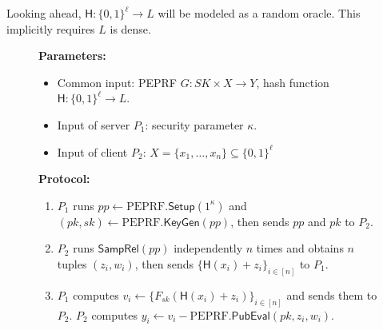 \documentclass[a4paper,10pt]{article}
\begin{document}
\begin{remark}
Looking ahead, $\mathsf{H}: \{0,1\}^\ell \rightarrow L$ will be modeled as a random oracle. 
This implicitly requires $L$ is dense. 
\end{remark}

\begin{figure}[!hbtp]
\begin{framed}
\begin{minipage}[center]{\textwidth}
\begin{trivlist}
\item \textbf{Parameters:} 
\begin{itemize}
    \item Common input: PEPRF $G: SK \times X \rightarrow Y$, hash function $\mathsf{H}: \{0,1\}^\ell \rightarrow L$. 

    \item Input of server $P_1$: security parameter $\kappa$.

    \item Input of client $P_2$: $X = \{x_1, \dots, x_n\} \subseteq \{0,1\}^\ell$ 
\end{itemize}

\item \textbf{Protocol:}

\begin{enumerate}
\item $P_1$ runs $pp \leftarrow \text{PEPRF}.\mathsf{Setup}(1^\kappa)$ 
    and $(pk, sk) \leftarrow \text{PEPRF}.\mathsf{KeyGen}(pp)$, 
    then sends $pp$ and $pk$ to $P_2$. 

\item $P_2$ runs $\mathsf{SampRel}(pp)$ independently $n$ times and obtains $n$ tuples $(z_i, w_i)$, 
    then sends $\{\mathsf{H}(x_i)+z_i\}_{i \in [n]}$ to $P_1$. 

\item $P_1$ computes $v_i \leftarrow \{F_{sk}(\mathsf{H}(x_i)+z_i)\}_{i \in [n]}$ and sends them to $P_2$. 
    $P_2$ computes $y_i \leftarrow v_i - \text{PEPRF}.\mathsf{PubEval}(pk, z_i, w_i)$.    
\end{enumerate}
\end{trivlist}
\end{minipage}
\end{framed}

\begin{center}
\end{center}
\end{figure}
\end{document}
